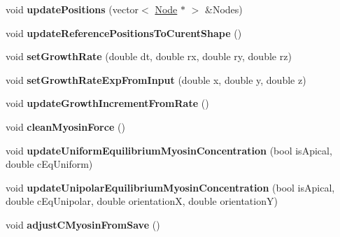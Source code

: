 \begin{DoxyCompactItemize}
\item 
\hypertarget{classShapeBase_a990c3d93836d53687b8af49a489dbde4}{}void {\bfseries update\+Positions} (vector$<$ \hyperlink{classNode}{Node} $\ast$ $>$ \&Nodes)\label{classShapeBase_a990c3d93836d53687b8af49a489dbde4}

\item 
\hypertarget{classShapeBase_a67c28a77c275496eaecc88005e097819}{}void {\bfseries update\+Reference\+Positions\+To\+Curent\+Shape} ()\label{classShapeBase_a67c28a77c275496eaecc88005e097819}

\item 
\hypertarget{classShapeBase_ac06c53088788e3c1461233623f506dbb}{}void {\bfseries set\+Growth\+Rate} (double dt, double rx, double ry, double rz)\label{classShapeBase_ac06c53088788e3c1461233623f506dbb}

\item 
\hypertarget{classShapeBase_ad463361e0b893ceee62a5c65c4c0e0f6}{}void {\bfseries set\+Growth\+Rate\+Exp\+From\+Input} (double x, double y, double z)\label{classShapeBase_ad463361e0b893ceee62a5c65c4c0e0f6}

\item 
\hypertarget{classShapeBase_ad7d7957431a1ae402347efb03ad94d0e}{}void {\bfseries update\+Growth\+Increment\+From\+Rate} ()\label{classShapeBase_ad7d7957431a1ae402347efb03ad94d0e}

\item 
\hypertarget{classShapeBase_aaf8312bb00ea6178abd9ebb1e8f40099}{}void {\bfseries clean\+Myosin\+Force} ()\label{classShapeBase_aaf8312bb00ea6178abd9ebb1e8f40099}

\item 
\hypertarget{classShapeBase_a47ac1da121eea90c265647b6f2115bfe}{}void {\bfseries update\+Uniform\+Equilibrium\+Myosin\+Concentration} (bool is\+Apical, double c\+Eq\+Uniform)\label{classShapeBase_a47ac1da121eea90c265647b6f2115bfe}

\item 
\hypertarget{classShapeBase_a6e4cc22d01118cf2dcb77276b56edf9d}{}void {\bfseries update\+Unipolar\+Equilibrium\+Myosin\+Concentration} (bool is\+Apical, double c\+Eq\+Unipolar, double orientation\+X, double orientation\+Y)\label{classShapeBase_a6e4cc22d01118cf2dcb77276b56edf9d}

\item 
\hypertarget{classShapeBase_ae141d5296b5b4ce7ca59b8c217ef2947}{}void {\bfseries adjust\+C\+Myosin\+From\+Save} ()\label{classShapeBase_ae141d5296b5b4ce7ca59b8c217ef2947}


\end{DoxyCompactItemize}
